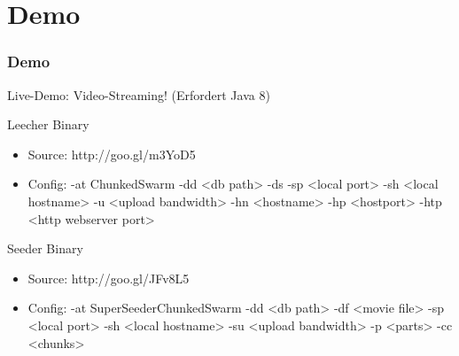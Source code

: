 \section{Demo}

\begin{frame}
  \frametitle{Demo}  

  Live-Demo: Video-Streaming! (Erfordert Java 8)

  \begin{exampleblock}{Leecher Binary}
      \begin{itemize}  
		  \item Source: http://goo.gl/m3YoD5
		  \vspace{1mm}
		  \item Config: -at ChunkedSwarm -dd <db path> -ds -sp <local port> -sh <local hostname> -u <upload bandwidth> -hn <hostname> -hp <hostport> -htp <http webserver port>
      \end{itemize}
  \end{exampleblock}

  \vspace{2mm}

  \begin{exampleblock}{Seeder Binary}
      \begin{itemize}  
		  \item Source: http://goo.gl/JFv8L5
		  \vspace{1mm}
		  \item Config: -at SuperSeederChunkedSwarm -dd <db path> -df <movie file> -sp <local port> -sh <local hostname> -su <upload bandwidth> -p <parts> -cc <chunks>
      \end{itemize}
  \end{exampleblock}
\end{frame}
